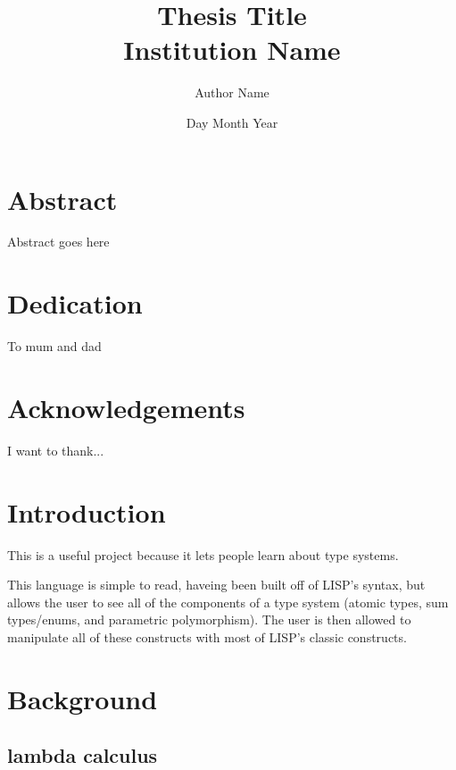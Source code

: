 \documentclass[12pt]{report}
\begin{document}
\title{
{Thesis Title}\\
{\large Institution Name}\\
}
\author{Author Name}
\date{Day Month Year}


\chapter*{Abstract}
Abstract goes here

\chapter*{Dedication}
To mum and dad


\chapter*{Acknowledgements}
I want to thank...

\tableofcontents

\chapter{Introduction}
This is a useful project because it lets people learn about type systems.

This language is simple to read, haveing been built off of LISP's syntax, but allows the user to see all of the components of a type system (atomic types, sum types/enums, and parametric polymorphism). The user is then allowed to manipulate all of these constructs with most of LISP's classic constructs.

\chapter{Background}
\section{lambda calculus}
\end{document}
